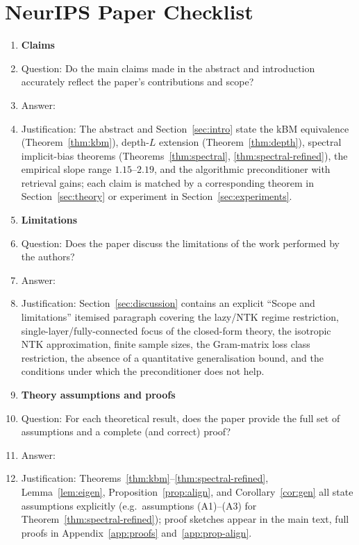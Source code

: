 \section*{NeurIPS Paper Checklist}

\begin{enumerate}

\item {\bf Claims}
    \item[] Question: Do the main claims made in the abstract and introduction accurately reflect the paper's contributions and scope?
    \item[] Answer: \answerYes{}
    \item[] Justification: The abstract and Section~\ref{sec:intro} state the kBM equivalence (Theorem~\ref{thm:kbm}), depth-$L$ extension (Theorem~\ref{thm:depth}), spectral implicit-bias theorems (Theorems~\ref{thm:spectral}, \ref{thm:spectral-refined}), the empirical slope range $1.15$--$2.19$, and the algorithmic preconditioner with retrieval gains; each claim is matched by a corresponding theorem in Section~\ref{sec:theory} or experiment in Section~\ref{sec:experiments}.

\item {\bf Limitations}
    \item[] Question: Does the paper discuss the limitations of the work performed by the authors?
    \item[] Answer: \answerYes{}
    \item[] Justification: Section~\ref{sec:discussion} contains an explicit ``Scope and limitations'' itemised paragraph covering the lazy/NTK regime restriction, single-layer/fully-connected focus of the closed-form theory, the isotropic NTK approximation, finite sample sizes, the Gram-matrix loss class restriction, the absence of a quantitative generalisation bound, and the conditions under which the preconditioner does not help.

\item {\bf Theory assumptions and proofs}
    \item[] Question: For each theoretical result, does the paper provide the full set of assumptions and a complete (and correct) proof?
    \item[] Answer: \answerYes{}
    \item[] Justification: Theorems~\ref{thm:kbm}--\ref{thm:spectral-refined}, Lemma~\ref{lem:eigen}, Proposition~\ref{prop:align}, and Corollary~\ref{cor:gen} all state assumptions explicitly (e.g.\ assumptions (A1)--(A3) for Theorem~\ref{thm:spectral-refined}); proof sketches appear in the main text, full proofs in Appendix~\ref{app:proofs} and~\ref{app:prop-align}.


\end{enumerate}
